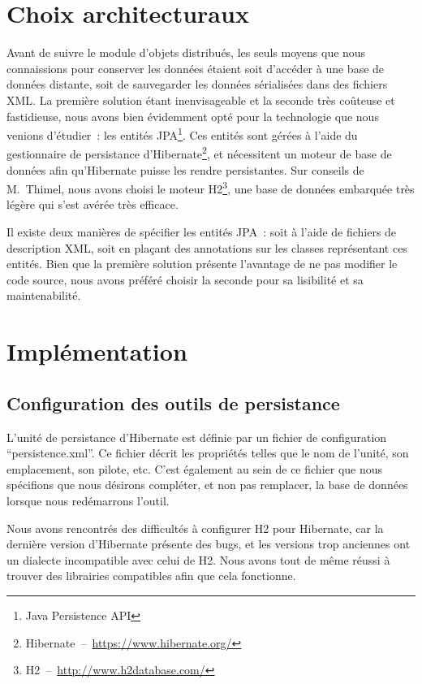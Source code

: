 \documentclass[a4paper, french, 11pt]{report}
\begin{document}
\chapter{Choix architecturaux}
Avant de suivre le module d'objets distribués, les seuls moyens que nous connaissions pour conserver les données étaient soit d'accéder à une base de données distante, soit de sauvegarder les données sérialisées dans des fichiers XML.
La première solution étant inenvisageable et la seconde très coûteuse et fastidieuse, nous avons bien évidemment opté pour la technologie que nous venions d'étudier~: les entités JPA\footnote{Java Persistence API}.
Ces entités sont gérées à l'aide du gestionnaire de persistance d'Hibernate\footnote{Hibernate~--~\url{https://www.hibernate.org/}}, et nécessitent un moteur de base de données afin qu'Hibernate puisse les rendre persistantes.
Sur conseils de M.~Thimel, nous avons choisi le moteur H2\footnote{H2~--~\url{http://www.h2database.com/}}, une base de données embarquée très légère qui s'est avérée très efficace.

Il existe deux manières de spécifier les entités JPA~: soit à l'aide de fichiers de description XML, soit en plaçant des annotations sur les classes représentant ces entités.
Bien que la première solution présente l'avantage de ne pas modifier le code source, nous avons préféré choisir la seconde pour sa lisibilité et sa maintenabilité.

\chapter{Implémentation}
\minitoc

\section{Configuration des outils de persistance}
L'unité de persistance d'Hibernate est définie par un fichier de configuration ``persistence.xml''.
Ce fichier décrit les propriétés telles que le nom de l'unité, son emplacement, son pilote, etc.
C'est également au sein de ce fichier que nous spécifions que nous désirons compléter, et non pas remplacer, la base de données lorsque nous redémarrons l'outil.

Nous avons rencontrés des difficultés à configurer H2 pour Hibernate, car la dernière version d'Hibernate présente des bugs, et les versions trop anciennes ont un dialecte incompatible avec celui de H2.
Nous avons tout de même réussi à trouver des librairies compatibles afin que cela fonctionne.
\end{document}
